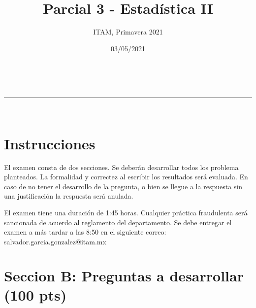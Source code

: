 \documentclass[addpoints]{exam}
\makeatletter
\newcommand{\linia}{\rule{\linewidth}{0.5pt}}
\theoremstyle{mytheor}
\renewcommand{\maketitle}{
    \begin{center}
    \vspace{2ex}
    {\huge \textsc{\@title}}
    \vspace{1ex}
    \\
    \linia\\
    \@author \hfill \@date
    \vspace{4ex}
    \end{center}
  }
\makeatother
\begin{document}
  
  \title{Parcial 3 - Estadística II}
  
  \author{ITAM, Primavera 2021}
  
  \date{03/05/2021}
  
  \maketitle
  
  \section*{Instrucciones}
  
 El examen consta de dos secciones. Se deberán desarrollar todos los problema planteados. La formalidad y correctez al escribir los resultados será evaluada. En caso de no tener el desarrollo de la pregunta, o bien se llegue a la respuesta sin una justificación la respuesta será anulada. 
  
  \vspace{10pt}
  
El examen tiene una duración de 1:45 horas. Cualquier práctica fraudulenta será sancionada de acuerdo al reglamento del departamento. Se debe entregar el examen a más tardar a las 8:50 en el siguiente correo: salvador.garcia.gonzalez@itam.mx

  \section*{Seccion B: Preguntas a desarrollar (100 pts)}
 
\end{document}
